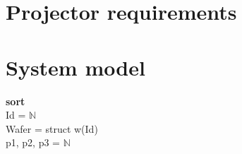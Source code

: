 \documentclass[12pt]{report}
\begin{document}
	\section{Projector requirements}
	\begin{itemize}
	\end{itemize}
	
	\section{System model}
	\textbf{sort}\\
		Id = $\mathbb{N}$\\
		Wafer = struct w(Id)\\
		p1, p2, p3 = $\mathbb{N}$\\
\end{document}
